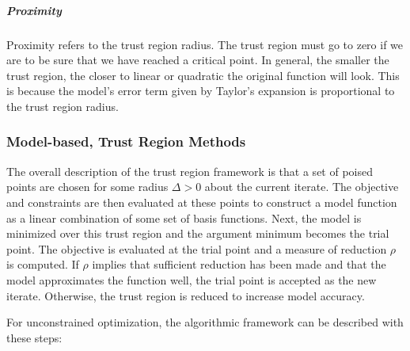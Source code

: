 \documentclass{article}
\begin{document}
\subparagraph{Proximity}

Proximity refers to the trust region radius.
The trust region must go to zero if we are to be sure that we have reached a critical point.
In general, the smaller the trust region, the closer to linear or quadratic the original function will look.
This is because the model's error term given by Taylor's expansion is proportional to the trust region radius.


\subsubsection{Model-based, Trust Region Methods}

The overall description of the trust region framework is that a set of poised points are chosen for some radius $\Delta>0$ about the current iterate.
The objective and constraints are then evaluated at these points to construct a model function as a linear combination of some set of basis functions.
Next, the model is minimized over this trust region and the argument minimum becomes the trial point.
The objective is evaluated at the trial point and a measure of reduction $\rho$ is computed.
If $\rho$ implies that sufficient reduction has been made and that the model approximates the function well, the trial point is accepted as the new iterate.
Otherwise, the trust region is reduced to increase model accuracy.


For unconstrained optimization, the algorithmic framework can be described with these steps:
\end{document}
